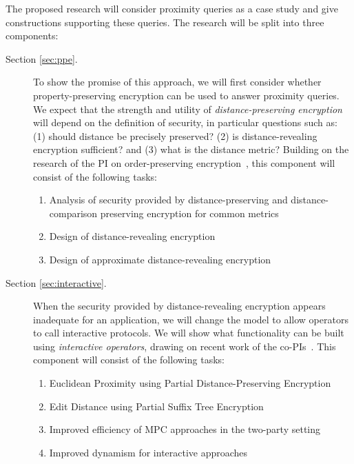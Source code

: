 \noindent
The proposed research will
consider proximity queries as a case study and give constructions supporting
these queries.  The research will be split into three components:
\begin{description}
\item[Section \ref{sec:ppe}.] To show the promise of this approach, we
will first consider whether property-preserving encryption can be used
to answer proximity queries.  We expect that the strength and utility of
\emph{distance-preserving encryption} will depend on the definition of
security, in particular questions such as: (1) should distance be precisely preserved? 
(2) is distance-revealing encryption sufficient? and (3) what is the distance
metric? Building on the research of the PI on order-preserving
encryption~\cite{EC:BCLO09,C:BolCheONe11}, this component will consist
of the following tasks:
\begin{enumerate}
\setlength\itemsep{0em}
\item Analysis of security provided by distance-preserving and distance-comparison preserving encryption for common metrics
\item Design of distance-revealing encryption
\item Design of approximate distance-revealing encryption
\end{enumerate}

\item[Section \ref{sec:interactive}.] When the security provided by
distance-revealing encryption appears inadequate for an application, we
will change the model to allow operators to call interactive protocols.
We will show what functionality can be built using \emph{interactive
operators}, drawing on recent work of the
co-PIs~\cite{SP:PKVKMC14,CCS:RACY16}.  This component will consist of
the following tasks:
\begin{enumerate}
\setlength\itemsep{0em}
\item Euclidean Proximity using Partial Distance-Preserving Encryption
\item Edit Distance using Partial Suffix Tree Encryption
\item Improved efficiency of MPC approaches in the two-party setting
\item Improved dynamism for interactive approaches
\end{enumerate}


\end{description}
